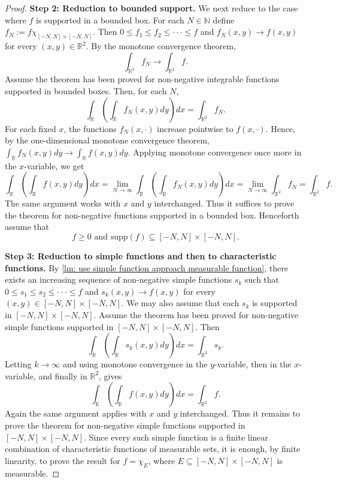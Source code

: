 \begin{proof}
\textbf{Step 2: Reduction to bounded support.}
We next reduce to the case where $f$ is supported in a bounded box. For each $N\in\mathbb{N}$ define $f_{N}:=f\chi_{[-N,N]\times[-N,N]}$. Then $0\le f_{1}\le f_{2}\le\cdot\cdot\cdot\le f$ and $f_{N}(x,y)\rightarrow f(x,y)$ for every $(x,y)\in\mathbb{R}^{2}$. By the monotone convergence theorem,
\[
    \int_{\mathbb{R}^{2}}f_{N}\longrightarrow\int_{\mathbb{R}^{2}}f.
\]
Assume the theorem has been proved for non-negative integrable functions supported in bounded boxes. Then, for each $N$,
\[
    \int_{\mathbb{R}}\left(\int_{\mathbb{R}}f_{N}(x,y)dy\right)dx=\int_{\mathbb{R}^{2}}f_{N}.
\]
For each fixed $x$, the functions $f_{N}(x,\cdot)$ increase pointwise to $f(x,\cdot)$. Hence, by the one-dimensional monotone convergence theorem, $\int_{\mathbb{R}}f_{N}(x,y)dy\longrightarrow\int_{\mathbb{R}}f(x,y)dy$. Applying monotone convergence once more in the $x$-variable, we get
\[
    \int_{\mathbb{R}}\left(\int_{\mathbb{R}}f(x,y)dy\right)dx=\lim_{N\rightarrow\infty}\int_{\mathbb{R}}\left(\int_{\mathbb{R}}f_{N}(x,y)dy\right)dx=\lim_{N\rightarrow\infty}\int_{\mathbb{R}^{2}}f_{N}=\int_{\mathbb{R}^{2}}f.
\]
The same argument works with $x$ and $y$ interchanged. Thus it suffices to prove the theorem for non-negative functions supported in a bounded box. Henceforth assume that
\[
    f\ge0 \text{ and } \text{supp}(f)\subseteq[-N,N]\times[-N,N].
\]

\textbf{Step 3: Reduction to simple functions and then to characteristic functions.}
By \autoref{lm: use simple function approach measurable function}, there exists an increasing sequence of non-negative simple functions $s_{k}$ such that $0\le s_{1}\le s_{2}\le\cdot\cdot\cdot\le f$ and $s_{k}(x,y)\rightarrow f(x,y)$ for every $(x,y)\in[-N,N]\times[-N,N]$. We may also assume that each $s_{k}$ is supported in $[-N,N]\times[-N,N]$. Assume the theorem has been proved for non-negative simple functions supported in $[-N,N]\times[-N,N]$. Then
\[
    \int_{\mathbb{R}}\left(\int_{\mathbb{R}}s_{k}(x,y)dy\right)dx=\int_{\mathbb{R}^{2}}s_{k}.
\]
Letting $k\rightarrow\infty$ and using monotone convergence in the $y$-variable, then in the $x$-variable, and finally in $\mathbb{R}^{2}$, gives
\[
    \int_{\mathbb{R}}\left(\int_{\mathbb{R}}f(x,y)dy\right)dx=\int_{\mathbb{R}^{2}}f.
\]
Again the same argument applies with $x$ and $y$ interchanged. Thus it remains to prove the theorem for non-negative simple functions supported in $[-N,N]\times[-N,N]$. Since every such simple function is a finite linear combination of characteristic functions of measurable sets, it is enough, by finite linearity, to prove the result for $f=\chi_{E}$, where $E\subseteq[-N,N]\times[-N,N]$ is measurable.


\end{proof}
